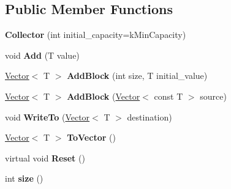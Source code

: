 \subsection*{Public Member Functions}
\begin{DoxyCompactItemize}
\item 
\hypertarget{classv8_1_1internal_1_1_collector_a3838b4dcbb90f36d647f824ad5fa0eb1}{}{\bfseries Collector} (int initial\+\_\+capacity=k\+Min\+Capacity)\label{classv8_1_1internal_1_1_collector_a3838b4dcbb90f36d647f824ad5fa0eb1}

\item 
\hypertarget{classv8_1_1internal_1_1_collector_acaac9bfd2e8781d32027df2c9f93e1b5}{}void {\bfseries Add} (T value)\label{classv8_1_1internal_1_1_collector_acaac9bfd2e8781d32027df2c9f93e1b5}

\item 
\hypertarget{classv8_1_1internal_1_1_collector_a3470f0a3600e437fbdee51a73300b19d}{}\hyperlink{classv8_1_1internal_1_1_vector}{Vector}$<$ T $>$ {\bfseries Add\+Block} (int size, T initial\+\_\+value)\label{classv8_1_1internal_1_1_collector_a3470f0a3600e437fbdee51a73300b19d}

\item 
\hypertarget{classv8_1_1internal_1_1_collector_aa2745d1f45025ce3450802841ad7c353}{}\hyperlink{classv8_1_1internal_1_1_vector}{Vector}$<$ T $>$ {\bfseries Add\+Block} (\hyperlink{classv8_1_1internal_1_1_vector}{Vector}$<$ const T $>$ source)\label{classv8_1_1internal_1_1_collector_aa2745d1f45025ce3450802841ad7c353}

\item 
\hypertarget{classv8_1_1internal_1_1_collector_a2f49f357b0782e14e3e2435123768322}{}void {\bfseries Write\+To} (\hyperlink{classv8_1_1internal_1_1_vector}{Vector}$<$ T $>$ destination)\label{classv8_1_1internal_1_1_collector_a2f49f357b0782e14e3e2435123768322}

\item 
\hypertarget{classv8_1_1internal_1_1_collector_ac5d8e65cff7970930aa9d0444057d31f}{}\hyperlink{classv8_1_1internal_1_1_vector}{Vector}$<$ T $>$ {\bfseries To\+Vector} ()\label{classv8_1_1internal_1_1_collector_ac5d8e65cff7970930aa9d0444057d31f}

\item 
\hypertarget{classv8_1_1internal_1_1_collector_a10426104ab971294f59d63db58300442}{}virtual void {\bfseries Reset} ()\label{classv8_1_1internal_1_1_collector_a10426104ab971294f59d63db58300442}

\item 
\hypertarget{classv8_1_1internal_1_1_collector_a63d78fce1c0b6ee317f13bb07f8fdfcc}{}int {\bfseries size} ()\label{classv8_1_1internal_1_1_collector_a63d78fce1c0b6ee317f13bb07f8fdfcc}

\end{DoxyCompactItemize}
